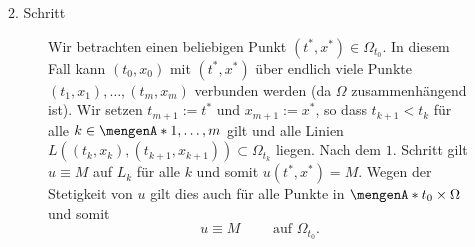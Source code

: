 \begin{beweis}
\begin{description}
\begin{description}
\[			\]
			\item[$2$. Schritt] Wir betrachten einen beliebigen Punkt $(t^{*},x^{*}) \in \Omega_{t_0}$. 
			In diesem Fall kann $(t_0,x_0)$ mit $(t^{*},x^{*})$ über endlich viele Punkte $(t_1,x_1), \dots, (t_m,x_m)$ verbunden werden 
			(da $\Omega$ zusammenhängend ist). Wir setzen $t_{m+1}:= t^{*}$ und $x_{m+1}:= x^{*}$, so dass $t_{k+1} < t_k$ für alle $k \in \set{1,\dots,m}$ gilt
			und alle Linien $L((t_k,x_k),(t_{k+1},x_{k+1})) \subset \Omega_{t_k}$ liegen. Nach dem $1$. Schritt gilt $u \equiv M$ auf $L_k$ für alle $k$ und somit 
			$u(t^{*},x^{*}) = M$. Wegen der Stetigkeit von $u$ gilt dies auch für alle Punkte in $\set{t_0} \times \Omega$ und somit 
			\[
				u \equiv M \qquad \text{ auf } \Omega_{t_0}.
 			\] 
		\end{description}
	\end{description}
\end{beweis}